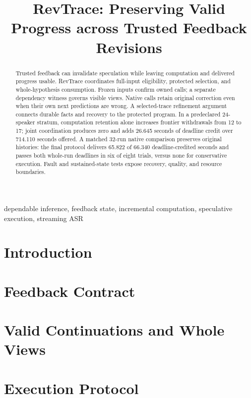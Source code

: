 \documentclass[conference,10pt]{IEEEtran}
\begin{document}
\title{RevTrace: Preserving Valid Progress across Trusted Feedback Revisions}
\author{}
\maketitle
\begin{abstract}
Trusted feedback can invalidate speculation while leaving computation and
delivered progress usable. RevTrace coordinates full-input eligibility,
protected selection, and whole-hypothesis consumption. Frozen inputs
confirm owned calls; a separate dependency witness governs visible views.
Native calls retain original correction even when their own next
predictions are wrong. A selected-trace refinement argument connects
durable facts and recovery to the protected program. In a predeclared
24-speaker stratum, computation retention alone increases frontier
withdrawals from 12 to 17; joint coordination produces zero and adds
26.645 seconds of deadline credit over 714.110 seconds offered. A matched
32-run native comparison preserves original histories: the final protocol
delivers 65.822 of 66.340 deadline-credited seconds and passes both
whole-run deadlines in six of eight trials, versus none for conservative
execution. Fault and sustained-state tests expose recovery, quality,
and resource boundaries.
\end{abstract}
\begin{IEEEkeywords}
dependable inference, feedback state, incremental computation, speculative execution, streaming ASR
\end{IEEEkeywords}
\section{Introduction}\label{sec:intro}

\section{Feedback Contract}\label{sec:contract}

\section{Valid Continuations and Whole Views}\label{sec:continuation}



\section{Execution Protocol}\label{sec:protocol}


\end{document}
